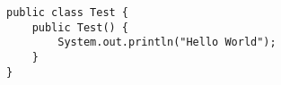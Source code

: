 \begin{lstlisting}[style=Java]
public class Test {
	public Test() {
		System.out.println("Hello World");
	}	
}
\end{lstlisting}